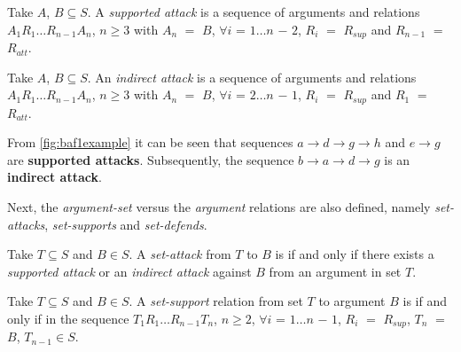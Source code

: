             \begin{definition}
                Take $A$, $B \subseteq S$. A \textit{supported attack} is a sequence of arguments and relations $A_{1} R_{1} \ldots R_{n - 1} A_{n}$, $n \geq 3$ with $A_{n}$ $=$ $B$, $\forall i$ = $1 \ldots n$ $-$ $2$, $R_{i}$ $=$ $R_{sup}$ and $R_{n - 1}$ $=$ $R_{att}$.
                \label{definition:definition11}
            \end{definition}
            
            \begin{definition}
                Take $A$, $B \subseteq S$. An \textit{indirect attack} is a sequence of arguments and relations $A_{1} R_{1} \ldots R_{n - 1} A_{n}$, $n \geq 3$ with $A_{n}$ $=$ $B$, $\forall i$ = $2 \ldots n$ $-$ $1$, $R_{i}$ $=$ $R_{sup}$ and $R_{1}$ $=$ $R_{att}$.
                \label{definition:definition12}
            \end{definition}
            
            \begin{exa}
                From \autoref{fig:baf1example} it can be seen that sequences $a \rightarrow d \rightarrow g \rightarrow h$ and $e \rightarrow g$ are \textbf{supported attacks}. Subsequently, the sequence $b \rightarrow a \rightarrow d \rightarrow g$ is an \textbf{indirect attack}.
                \label{exa:example11}
            \end{exa}
            
            Next, the \textit{argument-set} versus the \textit{argument} relations are also defined, namely \textit{set-attacks}, \textit{set-supports} and \textit{set-defends}.
            
            \begin{definition}
                Take $T \subseteq S$ and $B \in S$. A \textit{set-attack} from $T$ to $B$ is if and only if there exists a \textit{supported attack} or an \textit{indirect attack} against $B$ from an argument in set $T$.
                \label{definition:definition13}
            \end{definition}
            
            \begin{definition}
                Take $T \subseteq S$ and $B \in S$. A \textit{set-support} relation from set $T$ to argument $B$ is if and only if in the sequence $T_{1} R_{1} \ldots R_{n - 1} T_{n}$, $n \geq 2$, $\forall i$ = $1 \ldots n$ $-$ $1$, $R_{i}$ $=$ $R_{sup}$, $T_{n}$ $=$ $B$, $T_{n - 1} \in S$.
                \label{definition:definition14}
            \end{definition}
            
